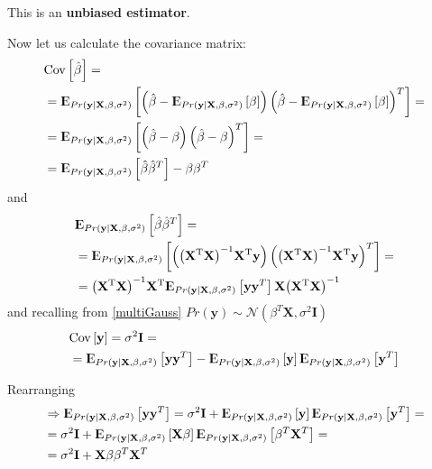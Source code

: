 \documentclass[12pt, letterpaper]{article}
\theoremstyle{definition}
\newcommand{\E}{{\rm I\kern-.3em E}}
\newcommand{\Cov}{\mathrm{Cov}}
\newcommand{\X}{\mathrm{\mathbf{X}}}
\newcommand{\y}{\mathbf{y}}
\newcommand{\inv}{\mathrm{\left( \X^T\X\right)^{-1}}}
\newcommand{\HM}{\mathrm{\inv\X^T}}
\newcommand{\hb}{\mathrm{\hat{\mathbf{\beta}}}}
\begin{document}
This is an \textbf{unbiased estimator}.

Now let us calculate the covariance matrix:
\begin{equation}
\begin{aligned}
&\Cov \left[\hb \right] = \\
&=\E_{Pr(\y|\X,\beta, \sigma^2)}\left[ \left( \hb -\E_{Pr(\y|\X,\beta, \sigma^2)}\left[ \beta\right] \right) \left( \hb -\E_{Pr(\y|\X,\beta, \sigma^2)}\left[ \beta\right] \right)^T\right] = \\
&=\E_{Pr(\y|\X,\beta, \sigma^2)}\left[ \left( \hb - \beta \right) \left( \hb - \beta \right)^T\right] =\\
&=\E_{Pr(\y|\X,\beta, \sigma^2)}\left[ \hb\hb^T\right] -\beta\beta^T\end{aligned}
\end{equation}
and
\begin{equation}
\begin{aligned}
&\E_{Pr(\y|\X,\beta, \sigma^2)}\left[ \hb\hb^T\right] = \\
&=\E_{Pr(\y|\X,\beta, \sigma^2)} \left[ \left( \HM \y\right)\left( \HM \y\right)^T\right] = \\
& = \HM\E_{Pr(\y|\X,\beta, \sigma^2)} \left[   \y  \y^T\right] \X \inv
\end{aligned}
\end{equation}
and recalling from \ref{multiGauss} $Pr(\y) \sim \mathcal{N}(\beta^T \X ,\sigma^2 \mathbf{I})$
\begin{equation}
\begin{aligned}
&\Cov\left[ \y\right]=\sigma^2 \mathbf{I} =\\
&=\E_{Pr(\y|\X,\beta, \sigma^2)}\left[ \y\y^T\right]  - \E_{Pr(\y|\X,\beta, \sigma^2)}\left[ \y\right]\E_{Pr(\y|\X,\beta, \sigma^2)}\left[ \y^T\right]\\
\end{aligned}
\end{equation}

Rearranging
\begin{equation}
\begin{aligned}
&\Rightarrow \E_{Pr(\y|\X,\beta, \sigma^2)}\left[ \y\y^T\right] = \sigma^2 \mathbf{I} +\E_{Pr(\y|\X,\beta, \sigma^2)}\left[ \y\right]\E_{Pr(\y|\X,\beta, \sigma^2)}\left[ \y^T\right] =\\
&=\sigma^2 \mathbf{I} +\E_{Pr(\y|\X,\beta, \sigma^2)}\left[ \X\beta\right]\E_{Pr(\y|\X,\beta, \sigma^2)}\left[ \beta^T\X^T\right] =\\
&= \sigma^2 \mathbf{I} +\X\beta \beta^T\X^T
\end{aligned}
\end{equation}
\end{document}
